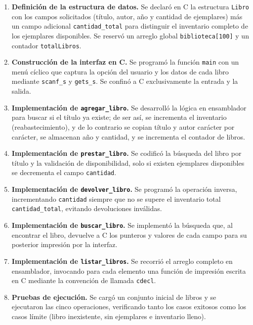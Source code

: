 \documentclass[a4paper,12pt]{article}
\begin{document}
\begin{enumerate}[label=\textbf{\arabic*.}]
    \item \textbf{Definición de la estructura de datos.} Se declaró en C la estructura \texttt{Libro} con los campos solicitados (título, autor, año y cantidad de ejemplares) más un campo adicional \texttt{cantidad\_total} para distinguir el inventario completo de los ejemplares disponibles. Se reservó un arreglo global \texttt{biblioteca[100]} y un contador \texttt{totalLibros}.

    \item \textbf{Construcción de la interfaz en C.} Se programó la función \texttt{main} con un menú cíclico que captura la opción del usuario y los datos de cada libro mediante \texttt{scanf\_s} y \texttt{gets\_s}. Se confinó a C exclusivamente la entrada y la salida.

    \item \textbf{Implementación de \texttt{agregar\_libro}.} Se desarrolló la lógica en ensamblador para buscar si el título ya existe; de ser así, se incrementa el inventario (reabastecimiento), y de lo contrario se copian título y autor carácter por carácter, se almacenan año y cantidad, y se incrementa el contador de libros.

    \item \textbf{Implementación de \texttt{prestar\_libro}.} Se codificó la búsqueda del libro por título y la validación de disponibilidad, solo si existen ejemplares disponibles se decrementa el campo \texttt{cantidad}.

    \item \textbf{Implementación de \texttt{devolver\_libro}.} Se programó la operación inversa, incrementando \texttt{cantidad} siempre que no se supere el inventario total \texttt{cantidad\_total}, evitando devoluciones inválidas.

    \item \textbf{Implementación de \texttt{buscar\_libro}.} Se implementó la búsqueda que, al encontrar el libro, devuelve a C los punteros y valores de cada campo para su posterior impresión por la interfaz.

    \item \textbf{Implementación de \texttt{listar\_libros}.} Se recorrió el arreglo completo en ensamblador, invocando para cada elemento una función de impresión escrita en C mediante la convención de llamada \texttt{cdecl}.

    \item \textbf{Pruebas de ejecución.} Se cargó un conjunto inicial de libros y se ejecutaron las cinco operaciones, verificando tanto los casos exitosos como los casos límite (libro inexistente, sin ejemplares e inventario lleno).
\end{enumerate}
\end{document}
